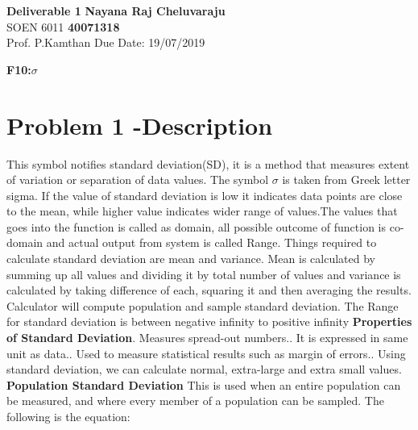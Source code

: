 \documentclass[a4paper,11pt]{article}
\begin{document}
\begin{titlepage}
\noindent
\large\textbf{Deliverable 1} \hfill \textbf{Nayana Raj Cheluvaraju} \\
\normalsize SOEN 6011 \hfill \textbf{40071318} \\
Prof. P.Kamthan \hfill Due Date: 19/07/2019 \\

    \begin{center}
        \large\textbf{F10:$\sigma$}
    \end{center}
  
    
\section{Problem 1 -Description}
This symbol notifies standard deviation(SD), it is a method that measures extent of variation or separation of data values. The symbol $\sigma$  is taken from Greek letter sigma. If the value of standard deviation is low it indicates data points are close to the mean, while higher value indicates wider range of values.The values that goes into the function is called as domain, all possible outcome of function is co-domain and actual output from system is called Range. Things required to calculate standard deviation are mean and variance. Mean is calculated by summing up all values and dividing it by total number of values and variance is calculated by taking difference of each, squaring it and then averaging the results. Calculator will compute population and sample standard deviation.\newline
The Range for standard deviation is between negative infinity to positive infinity\newline
\textbf{Properties of Standard Deviation}.	Measures spread-out numbers..	It is expressed in same unit as data..	Used to measure statistical results such as margin of errors..	Using standard deviation, we can calculate normal, extra-large and extra small values.
\newline
\newline
\textbf{Population Standard Deviation}
\newline
This is used when an entire population can be measured, and where every member of a population can be sampled. The following is the equation:
\begin{center}

\end{center}
\end{titlepage}
\end{document}
